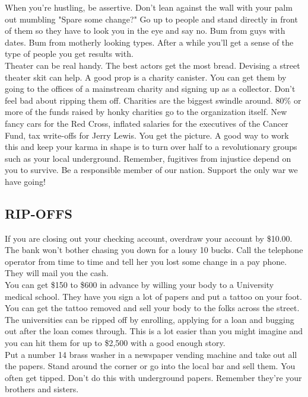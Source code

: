 \documentclass[11pt,twoside,a4paper]{book}
\begin{document}
When you're hustling, be assertive. Don't lean against the wall with your palm out mumbling "Spare some change?" Go up to people and stand directly in front of them so they have to look you in the eye and say no. Bum from guys with dates. Bum from motherly looking types. After a while you'll get a sense of the type of people you get results with.~\\

Theater can be real handy. The best actors get the most bread. Devising a street theater skit can help. A good prop is a charity canister. You can get them by going to the offices of a mainstream charity and signing up as a collector. Don't feel bad about ripping them off. Charities are the biggest swindle around. 80\% or more of the funds raised by honky charities go to the organization itself. New fancy cars for the Red Cross, inflated salaries for the executives of the Cancer Fund, tax write-offs for Jerry Lewis. You get the picture. A good way to work this and keep your karma in shape is to turn over half to a revolutionary groups such as your local underground. Remember, fugitives from injustice depend on you to survive. Be a responsible member of our nation. Support the only war we have going!~\\

\subsection{RIP-OFFS}

If you are closing out your checking account, overdraw your account by \$10.00. The bank won't bother chasing you down for a lousy 10 bucks. Call the telephone operator from time to time and tell her you lost some change in a pay phone. They will mail you the cash.~\\

You can get \$150 to \$600 in advance by willing your body to a University medical school. They have you sign a lot of papers and put a tattoo on your foot. You can get the tattoo removed and sell your body to the folks across the street. The universities can be ripped off by enrolling, applying for a loan and bugging out after the loan comes through. This is a lot easier than you might imagine and you can hit them for up to \$2,500 with a good enough story.~\\

Put a number 14 brass washer in a newspaper vending machine and take out all the papers. Stand around the corner or go into the local bar and sell them. You often get tipped. Don't do this with underground papers. Remember they're your brothers and sisters.~\\
\end{document}
